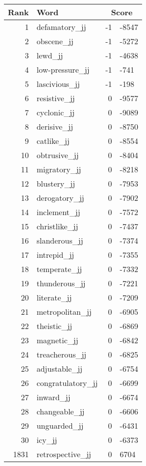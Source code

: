 \begin{longtable}[!htbp]{| rlr@{.}l |}
    \hline
    \textbf{Rank} & \textbf{Word} & \multicolumn{2}{c|}{\textbf{Score}} \\
    \hline
    \endhead
    1 & defamatory\_jj & -1 & -8547 \\
    2 & obscene\_jj & -1 & -5272 \\
    3 & lewd\_jj & -1 & -4638 \\
    4 & low-pressure\_jj & -1 & -741 \\
    5 & lascivious\_jj & -1 & -198 \\
    6 & resistive\_jj & 0 & -9577 \\
    7 & cyclonic\_jj & 0 & -9089 \\
    8 & derisive\_jj & 0 & -8750 \\
    9 & catlike\_jj & 0 & -8554 \\
    10 & obtrusive\_jj & 0 & -8404 \\
    11 & migratory\_jj & 0 & -8218 \\
    12 & blustery\_jj & 0 & -7953 \\
    13 & derogatory\_jj & 0 & -7902 \\
    14 & inclement\_jj & 0 & -7572 \\
    15 & christlike\_jj & 0 & -7437 \\
    16 & slanderous\_jj & 0 & -7374 \\
    17 & intrepid\_jj & 0 & -7355 \\
    18 & temperate\_jj & 0 & -7332 \\
    19 & thunderous\_jj & 0 & -7221 \\
    20 & literate\_jj & 0 & -7209 \\
    21 & metropolitan\_jj & 0 & -6905 \\
    22 & theistic\_jj & 0 & -6869 \\
    23 & magnetic\_jj & 0 & -6842 \\
    24 & treacherous\_jj & 0 & -6825 \\
    25 & adjustable\_jj & 0 & -6754 \\
    26 & congratulatory\_jj & 0 & -6699 \\
    27 & inward\_jj & 0 & -6674 \\
    28 & changeable\_jj & 0 & -6606 \\
    29 & unguarded\_jj & 0 & -6431 \\
    30 & icy\_jj & 0 & -6373 \\
    1831 & retrospective\_jj & 0 & 6704 \\

\end{longtable}
